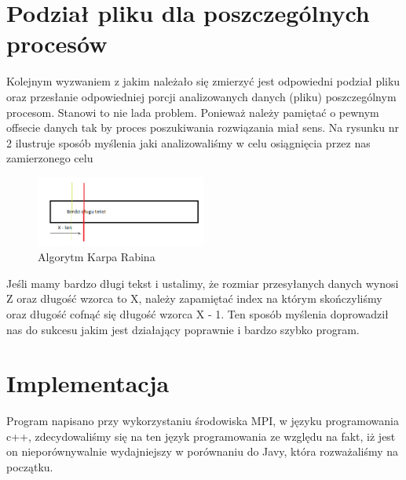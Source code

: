 \documentclass[12pt,a4paper]{article}
\begin{document}
\section*{Podział pliku dla poszczególnych procesów}

Kolejnym wyzwaniem z jakim należało się zmierzyć jest odpowiedni podział pliku oraz przesłanie odpowiedniej porcji analizowanych danych (pliku) poszczególnym procesom. Stanowi to nie lada problem.
Ponieważ należy pamiętać o pewnym offsecie danych tak by proces poszukiwania rozwiązania miał sens.
Na rysunku nr 2 ilustruje sposób myślenia jaki analizowaliśmy w celu osiągnięcia przez nas zamierzonego celu

\begin{figure}
  \vspace{-20pt}
  \begin{center}
  \includegraphics[width=0.5\textwidth]{dane/podzial_danych.png}
  \end{center}
  \vspace{-20pt}
  \caption{Algorytm Karpa Rabina}
  \vspace{10pt}
\end{figure}

Jeśli mamy bardzo długi tekst i ustalimy, że rozmiar przesyłanych danych wynosi Z oraz długość wzorca to X, należy zapamiętać index na którym skończyliśmy oraz długość cofnąć się długość wzorca X - 1. Ten sposób myślenia doprowadził nas do sukcesu jakim jest działający poprawnie i bardzo szybko program.


\section*{Implementacja}

Program napisano przy wykorzystaniu środowiska MPI, w języku programowania c++, zdecydowaliśmy się na ten 
język programowania ze względu na fakt, iż jest on nieporównywalnie wydajniejszy w porównaniu do Javy, która rozważaliśmy na początku. 
\end{document}
